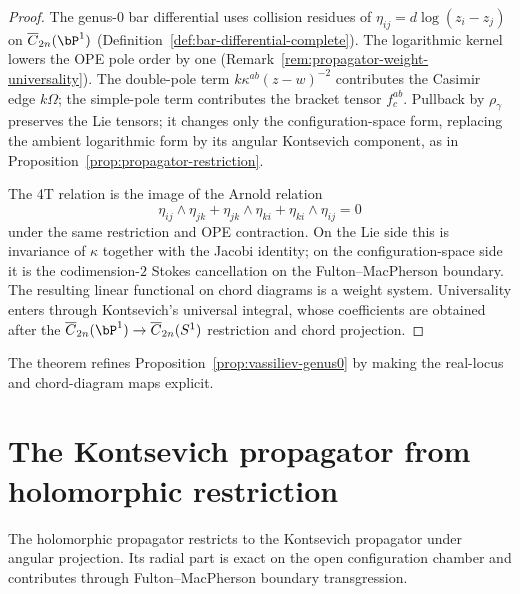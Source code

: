 \begin{proof}
The genus-$0$ bar differential uses collision residues of
$\eta_{ij}=d\log(z_i-z_j)$ on $\overline{C}_{2n}(\bP^1)$
(Definition~\ref{def:bar-differential-complete}). The logarithmic kernel lowers
the OPE pole order by one (Remark~\ref{rem:propagator-weight-universality}).
The double-pole term $k\kappa^{ab}(z-w)^{-2}$ contributes the Casimir edge
$k\Omega$; the simple-pole term contributes the bracket tensor $f^{ab}_{c}$.
Pullback by $\rho_\gamma$ preserves the Lie tensors; it changes only the
configuration-space form, replacing the ambient logarithmic form by its
angular Kontsevich component, as in Proposition~\ref{prop:propagator-restriction}.

The 4T relation is the image of the Arnold relation
\[
\eta_{ij}\wedge\eta_{jk}
+\eta_{jk}\wedge\eta_{ki}
+\eta_{ki}\wedge\eta_{ij}=0
\]
under the same restriction and OPE contraction. On the Lie side this is
invariance of $\kappa$ together with the Jacobi identity; on the
configuration-space side it is the codimension-$2$ Stokes cancellation on the
Fulton--MacPherson boundary. The resulting linear functional on chord diagrams
is a weight system. Universality enters through Kontsevich's universal
integral, whose coefficients are obtained after the
$\overline{C}_{2n}(\bP^1)\to\overline{C}_{2n}(S^1)$ restriction and chord
projection.
\end{proof}

The theorem refines Proposition~\ref{prop:vassiliev-genus0} by making the
real-locus and chord-diagram maps explicit.

\section{The Kontsevich propagator from holomorphic restriction}
\label{sec:kontsevich-propagator}

The holomorphic propagator restricts to the Kontsevich propagator under
angular projection. Its radial part is exact on the open configuration chamber
and contributes through Fulton--MacPherson boundary transgression.

